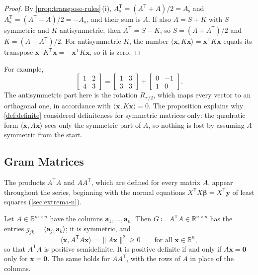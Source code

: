 \begin{proof}
By \cref{prop:transpose-rules}\,(i), $A_{\mathrm s}^{\mathsf T}=(A^{\mathsf T}+A)/2=A_{\mathrm s}$ and $A_{\mathrm a}^{\mathsf T}=(A^{\mathsf T}-A)/2=-A_{\mathrm a}$, and their sum is $A$. If also $A=S+K$ with $S$ symmetric and $K$ antisymmetric, then $A^{\mathsf T}=S-K$, so $S=(A+A^{\mathsf T})/2$ and $K=(A-A^{\mathsf T})/2$. For antisymmetric $K$, the number $\langle\mathbf x,K\mathbf x\rangle=\mathbf x^{\mathsf T}K\mathbf x$ equals its transpose $\mathbf x^{\mathsf T}K^{\mathsf T}\mathbf x=-\mathbf x^{\mathsf T}K\mathbf x$, so it is zero.
\end{proof}

For example,
\[
\begin{bmatrix}1&2\\4&3\end{bmatrix}=\begin{bmatrix}1&3\\3&3\end{bmatrix}+\begin{bmatrix}0&-1\\1&0\end{bmatrix}.
\]
The antisymmetric part here is the rotation $R_{\pi/2}$, which maps every vector to an orthogonal one, in accordance with $\langle\mathbf x,K\mathbf x\rangle=0$. The proposition explains why \cref{def:definite} considered definiteness for symmetric matrices only: the quadratic form $\langle\mathbf x,A\mathbf x\rangle$ sees only the symmetric part of $A$, so nothing is lost by assuming $A$ symmetric from the start.

\subsection{Gram Matrices}

The products $A^{\mathsf T}A$ and $AA^{\mathsf T}$, which are defined for every matrix $A$, appear throughout the series, beginning with the normal equations $X^{\mathsf T}X\boldsymbol\beta=X^{\mathsf T}\mathbf y$ of least squares (\cref{sec:extrema-n}).

\begin{proposition}
\label{prop:gram}
Let $A\in\mathbb R^{m\times n}$ have the columns $\mathbf a_1,\ldots,\mathbf a_n$. Then $G\coloneqq A^{\mathsf T}A\in\mathbb R^{n\times n}$ has the entries $g_{jk}=\langle\mathbf a_j,\mathbf a_k\rangle$; it is symmetric, and
\[
\langle\mathbf x,A^{\mathsf T}A\mathbf x\rangle=\|A\mathbf x\|^2\ge0\qquad\text{for all }\mathbf x\in\mathbb R^n ,
\]
so that $A^{\mathsf T}A$ is positive semidefinite. It is positive definite if and only if $A\mathbf x=\mathbf 0$ only for $\mathbf x=\mathbf 0$. The same holds for $AA^{\mathsf T}$, with the rows of $A$ in place of the columns.
\end{proposition}

